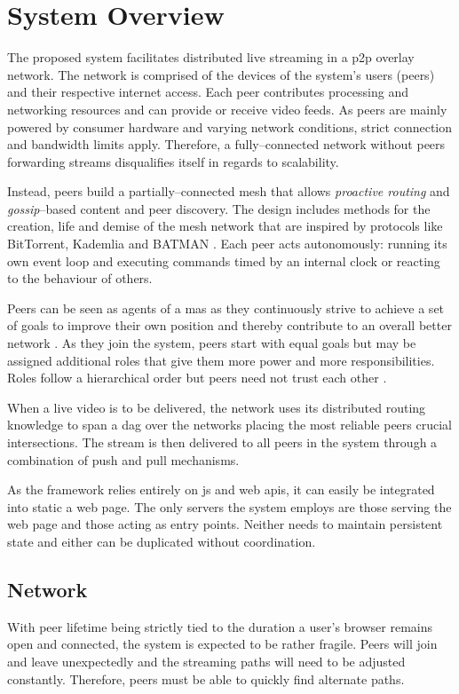 \section{System Overview}

The proposed system facilitates distributed live streaming in a \gls{p2p} overlay network. The network is comprised of the devices of the system's users (peers) and their respective internet access. Each peer contributes processing and networking resources and can provide or receive video feeds. As peers are mainly powered by consumer hardware and varying network conditions, strict connection and bandwidth limits apply. Therefore, a fully–connected network without peers forwarding streams disqualifies itself in regards to scalability.

Instead, peers build a partially–connected mesh that allows \textit{proactive routing} and \textit{gossip}–based content and peer discovery. The design includes methods for the creation, life and demise of the mesh network that are inspired by protocols like BitTorrent, Kademlia and BATMAN \cite{TODO}. Each peer acts autonomously: running its own event loop and executing commands timed by an internal clock or reacting to the behaviour of others.

Peers can be seen as agents of a \gls{mas} \cite{TODO-multiagent} as they continuously strive to achieve a set of goals to improve their own position and thereby contribute to an overall better network \cite{convergance}.
As they join the system, peers start with equal goals but may be assigned additional roles that give them more power and more responsibilities. Roles follow a hierarchical order but peers need not trust each other \cite{hmmmm-TODO}.

When a live video is to be delivered, the network uses its distributed routing knowledge to span a \gls{dag} over the networks placing the most reliable peers crucial intersections. The stream is then delivered to all peers in the system through a combination of push and pull mechanisms.

As the framework relies entirely on \gls{js} and web \glspl{api}, it can easily be integrated into static a web page. The only servers the system employs are those serving the web page and those acting as entry points. Neither needs to maintain persistent state and either can be duplicated without coordination.

\subsection{Network}
With peer lifetime being strictly tied to the duration a user's browser remains open and connected, the system is expected to be rather fragile. Peers will join and leave unexpectedly and the streaming paths will need to be adjusted constantly. Therefore, peers must be able to quickly find alternate paths.

